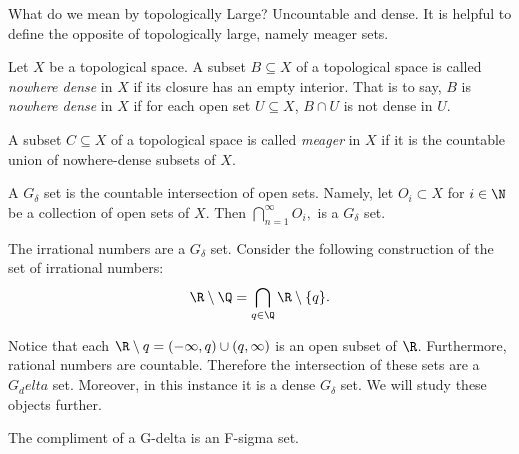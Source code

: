 What do we mean by topologically Large? Uncountable and dense.  It is helpful to define the opposite of topologically large, namely meager sets.  
\begin{definition}  Let $X$ be a topological space.  A subset $B \subseteq X$ of a topological space is called \textit{nowhere dense} in $X$ if its closure has an empty interior.  That is to say, $B$ is \textit{nowhere dense} in $X$ if for each open set $U\subseteq X$, $B\cap U$ is not dense in $U$.      
\end{definition}

\begin{definition}[Meager]  A subset $C \subseteq X$ of a topological space is called \textit{meager} in $X$ if it is the countable union of nowhere-dense subsets of $X$.    
\end{definition}

\begin{definition}
    A $G_\delta$ set is the countable intersection of open sets.  Namely, let $O_i \subset X$ for $i \in \N$ be a collection of open sets of $X$.  Then 
    $\bigcap_{n=1}^\infty O_i,$ is a $G_\delta$ set.  
\end{definition}

\begin{example}
    The irrational numbers are a $G_\delta$ set.  Consider the following construction of the set of irrational numbers:
    $$\R \setminus \Q = \bigcap_{q \in \Q}\R \setminus \{q\}.$$
\end{example}
Notice that each $\R\setminus q = (-\infty, q) \cup (q, \infty)$ is an open subset of $\R$.  Furthermore, rational numbers are countable.  Therefore the intersection of these sets are a $G_delta$ set.  Moreover, in this instance it is a dense $G_\delta$ set.  We will study these objects further.  

The compliment of a G-delta is an F-sigma set.  
